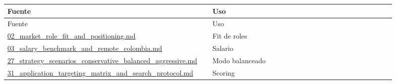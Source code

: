 \begin{center}
\scriptsize
\begin{longtable}{>{\raggedright\arraybackslash}p{0.455\linewidth} >{\raggedright\arraybackslash}p{0.455\linewidth}}
\toprule
Fuente & Uso \\
\midrule
\endfirsthead
\toprule
Fuente & Uso \\
\midrule
\endhead
\href{file:///E:/Laboral/02_market_role_fit_and_positioning.md}{02\_market\_role\_fit\_and\_positioning.md} & Fit de roles \\
\href{file:///E:/Laboral/03_salary_benchmark_and_remote_colombia.md}{03\_salary\_benchmark\_and\_remote\_colombia.md} & Salario \\
\href{file:///E:/Laboral/27_strategy_scenarios_conservative_balanced_aggressive.md}{27\_strategy\_scenarios\_conservative\_balanced\_aggressive.md} & Modo balanceado \\
\href{file:///E:/Laboral/31_application_targeting_matrix_and_search_protocol.md}{31\_application\_targeting\_matrix\_and\_search\_protocol.md} & Scoring \\
\bottomrule
\end{longtable}
\end{center}
